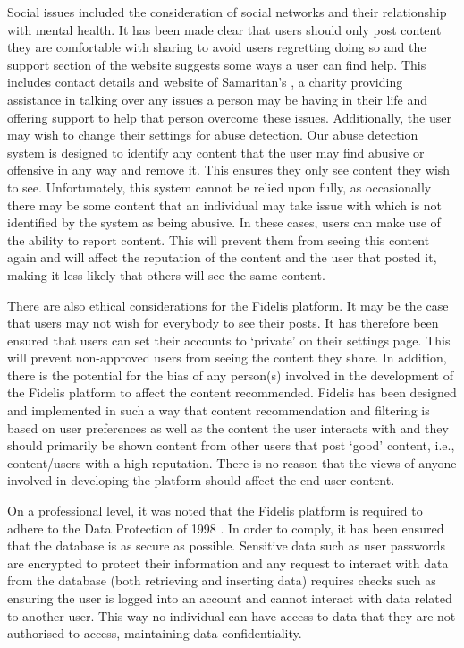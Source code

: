 Social issues included the consideration of social networks and their relationship with mental health. It has been made clear that users should only post content they are comfortable with sharing to avoid users regretting doing so and the support section of the website suggests some ways a user can find help. This includes contact details and website of Samaritan's \cite{Samaritans:Home}, a charity providing assistance in talking over any issues a person may be having in their life and offering support to help that person overcome these issues. Additionally, the user may wish to change their settings for abuse detection. Our abuse detection system is designed to identify any content that the user may find abusive or offensive in any way and remove it. This ensures they only see content they wish to see. Unfortunately, this system cannot be relied upon fully, as occasionally there may be some content that an individual may take issue with which is not identified by the system as being abusive. In these cases, users can make use of the ability to report content. This will prevent them from seeing this content again and will affect the reputation of the content and the user that posted it, making it less likely that others will see the same content.

There are also ethical considerations for the Fidelis platform. It may be the case that users may not wish for everybody to see their posts. It has therefore been ensured that users can set their accounts to `private' on their settings page. This will prevent non-approved users from seeing the content they share. In addition, there is the potential for the bias of any person(s) involved in the development of the Fidelis platform to affect the content recommended. Fidelis has been designed and implemented in such a way that content recommendation and filtering is based on user preferences as well as the content the user interacts with and they should primarily be shown content from other users that post `good' content, i.e., content/users with a high reputation. There is no reason that the views of anyone involved in developing the platform should affect the end-user content.

On a professional level, it was noted that the Fidelis platform is required to adhere to the Data Protection of 1998 \cite{DPA}. In order to comply, it has been ensured that the database is as secure as possible. Sensitive data such as user passwords are encrypted to protect their information and any request to interact with data from the database (both retrieving and inserting data) requires checks such as ensuring the user is logged into an account and cannot interact with data related to another user. This way no individual can have access to data that they are not authorised to access, maintaining data confidentiality.

